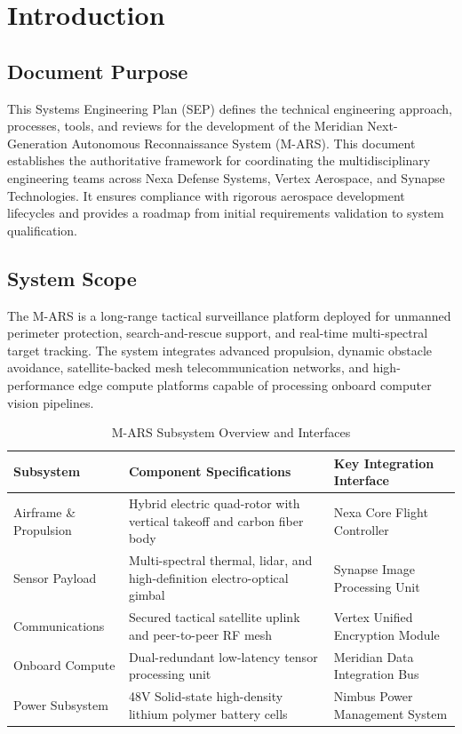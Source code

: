 \section{Introduction}

\subsection{Document Purpose}
This Systems Engineering Plan (SEP) defines the technical engineering approach, processes, tools, and reviews for the development of the Meridian Next-Generation Autonomous Reconnaissance System (M-ARS). This document establishes the authoritative framework for coordinating the multidisciplinary engineering teams across Nexa Defense Systems, Vertex Aerospace, and Synapse Technologies. It ensures compliance with rigorous aerospace development lifecycles and provides a roadmap from initial requirements validation to system qualification.

\subsection{System Scope}
The M-ARS is a long-range tactical surveillance platform deployed for unmanned perimeter protection, search-and-rescue support, and real-time multi-spectral target tracking. The system integrates advanced propulsion, dynamic obstacle avoidance, satellite-backed mesh telecommunication networks, and high-performance edge compute platforms capable of processing onboard computer vision pipelines.

\begin{table}[htbp]
\centering
\caption{M-ARS Subsystem Overview and Interfaces}
\label{tab:system_chars}
\small
\begin{tabularx}{\textwidth}{l p{5cm} X}
\toprule
\textbf{Subsystem} & \textbf{Component Specifications} & \textbf{Key Integration Interface} \\
\midrule
Airframe \& Propulsion & Hybrid electric quad-rotor with vertical takeoff and carbon fiber body & Nexa Core Flight Controller \\
Sensor Payload & Multi-spectral thermal, lidar, and high-definition electro-optical gimbal & Synapse Image Processing Unit \\
Communications & Secured tactical satellite uplink and peer-to-peer RF mesh & Vertex Unified Encryption Module \\
Onboard Compute & Dual-redundant low-latency tensor processing unit & Meridian Data Integration Bus \\
Power Subsystem & 48V Solid-state high-density lithium polymer battery cells & Nimbus Power Management System \\
\bottomrule
\end{tabularx}
\end{table}

